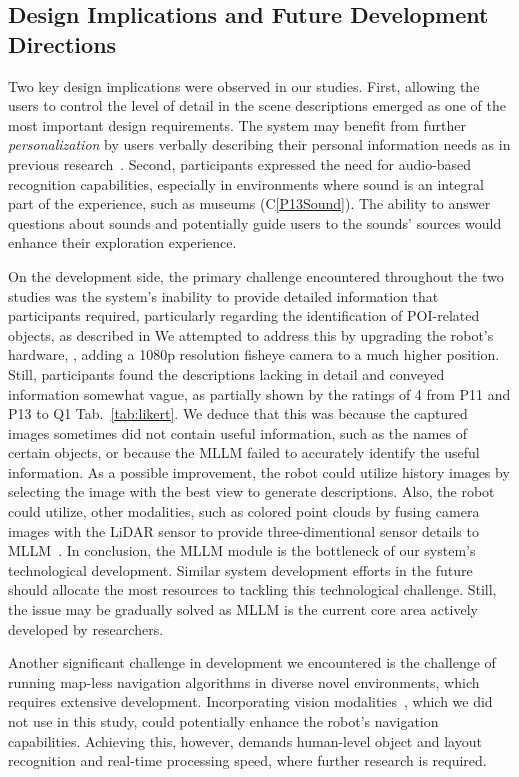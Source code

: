 \subsection{Design Implications and Future Development Directions} 
\label{sec:design_implication}
Two key design implications were observed in our studies. 
First, allowing the users to control the level of detail in the scene descriptions emerged as one of the most important design requirements. 
The system may benefit from further \textit{personalization} by users verbally describing their personal information needs as in previous research~\cite{Kaniwa2024ChitChatGuide}. 
Second, participants expressed the need for audio-based recognition capabilities, especially in environments where sound is an integral part of the experience, such as museums (C\ref{P13Sound}). 
The ability to answer questions about sounds and potentially guide users to the sounds' sources would enhance their exploration experience.

On the development side, the primary challenge encountered throughout the two studies was the system’s inability to provide detailed information that participants required, particularly regarding the identification of POI-related objects, as described in 
We attempted to address this by upgrading the robot's hardware, \ie, adding a 1080p resolution fisheye camera to a much higher position. 
Still, participants found the descriptions lacking in detail and conveyed information somewhat vague, as partially shown by the ratings of 4 from P11 and P13 to Q1 Tab.~\ref{tab:likert}. 
We deduce that this was because the captured images sometimes did not contain useful information, such as the names of certain objects, or because the MLLM failed to accurately identify the useful information.
As a possible improvement, the robot could utilize history images by selecting the image with the best view to generate descriptions. 
Also, the robot could utilize, other modalities, such as colored point clouds by fusing camera images with the LiDAR sensor to provide three-dimentional sensor details to MLLM~\cite{liu2024uni3d,xu2023pointllm}. 
In conclusion, the MLLM module is the bottleneck of our system's technological development.
Similar system development efforts in the future should allocate the most resources to tackling this technological challenge.
Still, the issue may be gradually solved as MLLM is the current core area actively developed by researchers.

Another significant challenge in development we encountered is the challenge of running map-less navigation algorithms in diverse novel environments, which requires extensive development. 
Incorporating vision modalities~\cite{chang2024goat}, which we did not use in this study, could potentially enhance the robot's navigation capabilities. 
Achieving this, however, demands human-level object and layout recognition and real-time processing speed, where further research is required.


